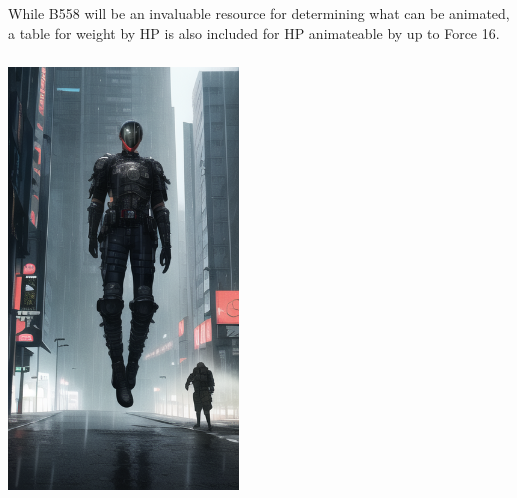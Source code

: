 \begin{multicols}{3}
	While B558 will be an invaluable resource for determining what can be animated, a table for weight by HP is also included for HP animateable by up to Force 16.	
	
	\includegraphics*[width=6.1cm, height=11.7cm]{levitate.png}
	

\end{multicols}
